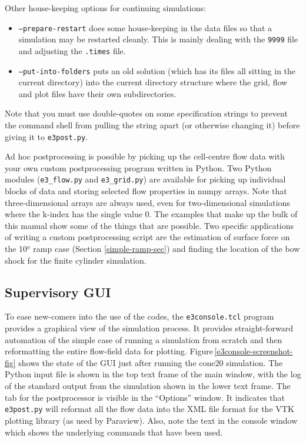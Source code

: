 Other house-keeping options for continuing simulations:
\begin{itemize}
  \item \texttt{--prepare-restart} does some house-keeping in the data files so that a simulation 
     may be restarted cleanly.  
     This is mainly dealing with the \texttt{9999} file and adjusting the \texttt{.times} file.
  \item \texttt{--put-into-folders} puts an old solution (which has its files all sitting in the current directory)
     into the current directory structure where the grid, flow and plot files have their own subdirectories.
\end{itemize}
Note that you must use double-quotes on some specification strings to prevent the command shell 
from pulling the string apart (or otherwise changing it) before giving it to \texttt{e3post.py}.

\medskip 
Ad hoc postprocessing is possible by picking up the cell-centre flow
data with your own custom postprocessing program written in Python.
Two Python modules (\texttt{e3\_flow.py} and \texttt{e3\_grid.py}) 
are available for picking up individual blocks of data and storing
selected flow properties in numpy arrays.
Note that three-dimensional arrays are always used, even for two-dimensional simulations
where the k-index has the single value 0.
The examples that make up the bulk of this manual show some of the things that are possible.
Two specific applications of writing a custom postprocessing script are the estimation of 
surface force on the 10$^o$ ramp case (Section \ref{simple-ramp-sec}) and 
finding the location of the bow shock for the finite cylinder simulation.

\subsection{Supervisory GUI}
%
To ease new-comers into the use of the codes, the \texttt{e3console.tcl} program provides
a graphical view of the simulation process.
It provides straight-forward automation of the simple case of running a simulation
from scratch and then reformatting the entire flow-field data for plotting.
Figure\,\ref{e3console-screenshot-fig} shows the state of the GUI just after running the
cone20 simulation.
The Python input file is shown in the top text frame of the main window, 
with the log of the standard output from the simulation shown in the lower text frame.
The tab for the postprocessor is visible in the ``Options'' window.
It indicates that \texttt{e3post.py} will reformat all the flow data into the XML
file format for the VTK plotting library (as used by Paraview).
Also, note the text in the console window which shows the underlying commands that have been used. 

